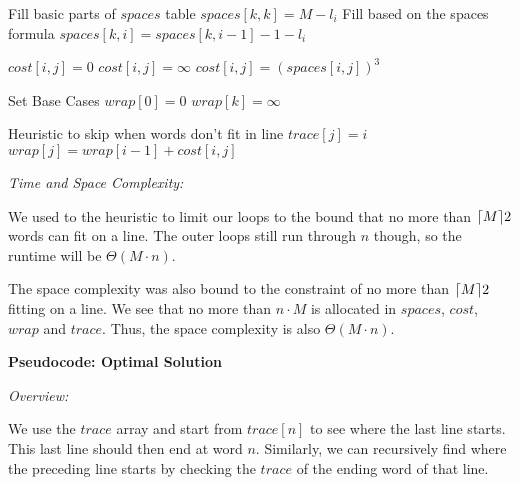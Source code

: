 \documentclass[a4paper]{report}
\DeclarePairedDelimiter{\ceil}{\lceil}{\rceil}
\begin{document}
\begin{enumerate}
\begin{algorithmic}[1]
          \Comment Fill basic parts of $spaces$ table
            \State $spaces[k,k] = M - l_{i}$
            \Comment Fill based on the spaces formula 
              \State $spaces[k,i] = spaces[k, i-1] - 1 - l_{i}$
            \EndFor
          \EndFor

                \State $cost[i,j] = 0$
                \State $cost[i,j] = \infty$
              \Else
                \State $cost[i,j] = (spaces[i,j])^3$
              \EndIf
            \EndFor
          \EndFor

          \Comment Set Base Cases
          \State $wrap[0]=0$
            \State $wrap[k] = \infty$
          \EndFor

            \Comment Heuristic to skip when words don't fit in line
                \State $trace[j] = i$
                \State $wrap[j] = wrap[i-1] + cost[i,j]$
              \EndIf
            \EndFor
          \EndFor


        \EndFunction
      \end{algorithmic}
      
      {\it Time and Space Complexity:}

      We used to the heuristic to limit our loops to the bound that no more than $\ceil{M}{2}$ words can fit on 
      a line. The outer loops still run through $n$ though, so the runtime will be $\Theta(M \cdot n)$.

      The space complexity was also bound to the constraint of no more than $\ceil{M}{2}$ fitting on a line. We see
      that no more than $n \cdot M$ is allocated in $spaces$, $cost$, $wrap$ and $trace$. Thus, the space complexity is
      also $\Theta(M \cdot n)$.


      {\bf Pseudocode: Optimal Solution}

      {\it Overview:}

      We use the $trace$ array and start from $trace[n]$ to see where the last line starts. This last line should then end
      at word $n$. Similarly, we can recursively find where the preceding line starts by checking the $trace$ of the 
      ending word of that line.


\end{enumerate}
\end{document}
